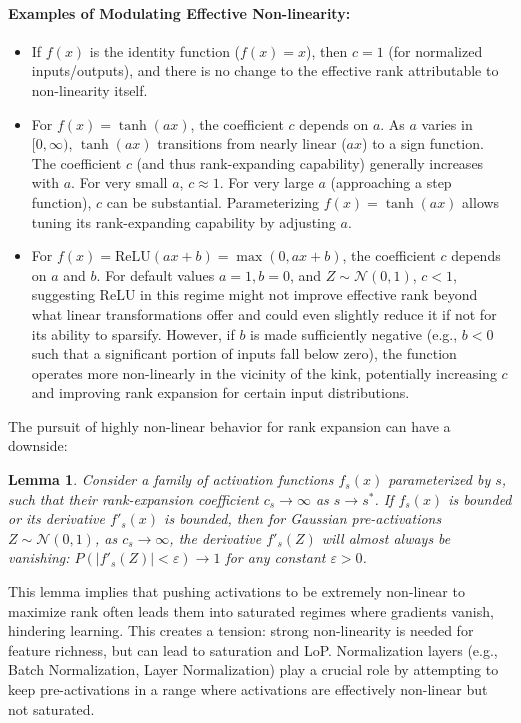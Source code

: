 \documentclass{article}
\newtheorem{lemma}{Lemma}[section]
\begin{document}
\paragraph{Examples of Modulating Effective Non-linearity:}
\begin{itemize}
    \item If $f(x)$ is the identity function ($f(x)=x$), then $c=1$ (for normalized inputs/outputs), and there is no change to the effective rank attributable to non-linearity itself.
    \item For $f(x) = \tanh(ax)$, the coefficient $c$ depends on $a$. As $a$ varies in $[0, \infty)$, $\tanh(ax)$ transitions from nearly linear ($ax$) to a sign function. The coefficient $c$ (and thus rank-expanding capability) generally increases with $a$. For very small $a$, $c \approx 1$. For very large $a$ (approaching a step function), $c$ can be substantial. Parameterizing $f(x) = \tanh(ax)$ allows tuning its rank-expanding capability by adjusting $a$.
    \item For $f(x) = \mathrm{ReLU}(ax+b) = \max(0, ax+b)$, the coefficient $c$ depends on $a$ and $b$. For default values $a=1, b=0$, and $Z \sim \mathcal{N}(0,1)$, $c < 1$, suggesting ReLU in this regime might not improve effective rank beyond what linear transformations offer and could even slightly reduce it if not for its ability to sparsify. However, if $b$ is made sufficiently negative (e.g., $b < 0$ such that a significant portion of inputs fall below zero), the function operates more non-linearly in the vicinity of the kink, potentially increasing $c$ and improving rank expansion for certain input distributions.
\end{itemize}

The pursuit of highly non-linear behavior for rank expansion can have a downside:
\begin{lemma}
\label{lemma:saturation_vanishing_gradients}
Consider a family of activation functions $f_s(x)$ parameterized by $s$, such that their rank-expansion coefficient $c_s \to \infty$ as $s \to s^*$. If $f_s(x)$ is bounded or its derivative $f'_s(x)$ is bounded, then for Gaussian pre-activations $Z \sim \mathcal{N}(0,1)$, as $c_s \to \infty$, the derivative $f'_s(Z)$ will almost always be vanishing: $P(|f'_s(Z)| < \varepsilon) \to 1$ for any constant $\varepsilon > 0$.
\end{lemma}
This lemma implies that pushing activations to be extremely non-linear to maximize rank often leads them into saturated regimes where gradients vanish, hindering learning. This creates a tension: strong non-linearity is needed for feature richness, but can lead to saturation and LoP. Normalization layers (e.g., Batch Normalization, Layer Normalization) play a crucial role by attempting to keep pre-activations in a range where activations are effectively non-linear but not saturated.
\end{document}
